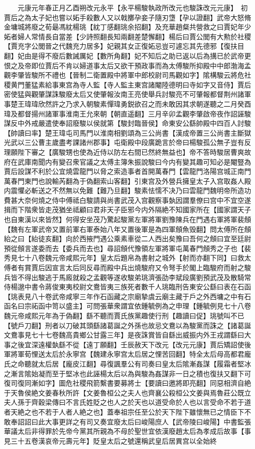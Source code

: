 　　元康元年春正月乙酉朔改元永平【永平楊駿執政所改元也駿誅改元元康】　初賈后之為太子妃也嘗以妬手殺數人又以戟擲孕妾子隨刃墯【孕以證翻】武帝大怒脩金墉城將廢之荀朂馮紞楊珧【紞丁感翻珧余招翻】及充華趙粲共營救之曰賈妃年少妬者婦人常情長自當差【少詩照翻長知兩翻差楚懈翻】楊后曰賈公閭有大勲於社稷【賈充字公閭晉之代魏充力居多】妃親其女正復妬忌豈可遽忘其先德邪【復扶目翻】妃由是得不廢后數誡厲妃【數所角翻】妃不知后之助已返以后為搆已於武帝更恨之及帝即位賈后不肯以婦道事太后又欲干預政事而為太傅駿所抑殿中中郎渤海孟觀李肇皆駿所不禮也【晉制二衛置殿中將軍中郎校尉司馬觀如字】隂構駿云將危社稷黄門董猛素給事東宫為寺人監【寺人監主東宫諸閹陸德明曰寺如字又音侍】賈后密使猛與觀肇謀誅駿廢太后又使肇報汝南王亮使舉兵討駿亮不可肇報都督荆州諸軍事楚王瑋瑋欣然許之乃求入朝駿素憚瑋勇鋭欲召之而未敢因其求朝遂聽之二月癸酉瑋及都督揚州諸軍事淮南王允來朝【朝直遥翻】三月辛卯孟觀李肇啟帝夜作詔誣駿謀反中外戒嚴遣使奉詔廢駿以侯就第【駿封臨晉侯】命東安公繇帥殿中四百人討駿【帥讀曰率】楚王瑋屯司馬門以淮南相劉頌為三公尚書【漢成帝置三公尚書主斷獄光武以三公曹主歲盡考課諸州郡事】屯衛殿中段廣跪言於帝曰楊駿孤公無子豈有反理願陛下審之【廣駿甥也使為近侍以防左右間已然終無益也】帝不答時駿居曹爽故府在武庫南聞内有變召衆官議之太傅主簿朱振說駿曰今内有變其趣可知必是閹豎為賈后設謀不利於公宜燒雲龍門以脅之索造事者首開萬春門【雲龍門洛陽宫城正南門萬春門東門也說輸芮翻為于偽翻索山客翻】引東宫及外營兵擁皇太子入宫取姦人殿内震懼必斬送之不然無以免難【難乃旦翻】駿素怯懦不决乃曰雲龍門魏明帝所造功費甚大奈何燒之侍中傅祗白駿請與尚書武茂入宫觀察事埶因謂羣僚曰宫中不宜空遂揖而下階衆皆走茂猶坐祗顧曰君非天子臣邪今内外隔絶不知國家所在【國家謂天子也自東漢以來皆然】何得安坐茂乃驚起駿黨左軍將軍劉豫陳兵在門遇右軍將軍裴頠【魏有左軍武帝又置前軍右軍泰始八年又置後軍是為四軍頠魚毁翻】問太傅所在頠紿之曰【紿徒亥翻】向於西掖門遇公乘素車從二人西出矣豫曰吾何之頠曰宜至廷尉預從頠言遂委而去【委兵而去也】尋詔頠代豫領左軍將軍屯萬春門頠秀之子也【裴秀見七十八卷魏元帝咸熙元年】皇太后題帛為書射之城外【射而亦翻下同】曰救太傅者有賞賈后因宣言太后同反尋而殿中兵出燒駿府又令弩手於閣上臨駿府而射之駿兵皆不得出駿逃于馬廄就殺之孟觀等遂收駿弟珧濟張劭李斌段廣劉預武茂及散騎常侍楊邈中書令蔣俊東夷校尉文鴦皆夷三族死者數千人珧臨刑告東安公繇曰表在石函【珧表見八十卷武帝咸寧三年作石函藏之宗廟摯虞云廟主藏于戶之外西墉之中有石函名曰宗祏函中笥以盛主】可問張華衆謂宜依鍾毓例為之申理【鍾毓例見七十八卷魏元帝咸熙元年為于偽翻】繇不聽而賈氏族黨趣使行刑【趣讀曰促】珧號叫不已【號戶刀翻】刑者以刀破其頭繇諸葛誕之外孫也故忌文鴦以為駿黨而誅之【諸葛誕文鴦事見七十七卷魏高貴鄉公甘露三年】是夜誅賞皆自繇出威振内外王戎謂繇曰大事之後宜深遠權埶繇不從【遠丁願翻】壬辰赦天下改元【改元元康】賈后矯詔使後軍將軍荀悝送太后於永寧宫【魏建永寧宫太后居之悝苦回翻】特全太后母高都君龐氏之命聽就太后居【龐皮江翻】尋復諷羣公有司奏曰皇太后隂漸姦謀【履霜者堅冰之漸言隂始凝而至于堅冰也此誣楊太后以為與駿為姦謀非一日之積也復扶又翻下可復司復同漸如字】圖危社稷飛箭繫書要募將士【要讀曰邀將即亮翻】同惡相濟自絶于天魯侯絶文姜春秋所許【文姜魯桓公之夫人也齊襄公殺桓公文姜與焉魯莊公既立夫人孫于齊穀梁傳曰不言氏姓貶之也人之於天也以道受命於人也以言受命不若于道者天絶之也不若于人者人絶之也】蓋奉祖宗任至公於天下陛下雖懷無已之情臣下不敢奉詔詔曰此大事更詳之有司又奏宜廢太后曰峻陽庶人【武帝陵曰峻陽】中書監張華議太后非得罪於先帝今黨其所親為不母於聖世宜依漢廢趙太后為孝成后故事【事見三十五卷漢哀帝元壽元年】貶皇太后之號還稱武皇后居異宫以全始終